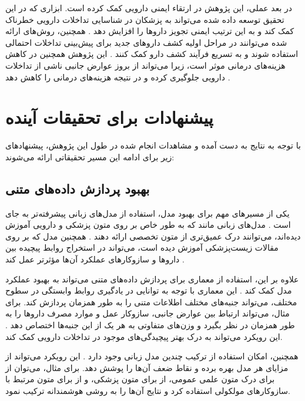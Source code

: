 در بعد عملی، این پژوهش در ارتقاء ایمنی دارویی کمک کرده است. ابزاری که در این تحقیق توسعه داده شده می‌تواند به پزشکان در شناسایی تداخلات دارویی خطرناک کمک کند و به این ترتیب ایمنی تجویز داروها را افزایش دهد \cite{ref_cascorbi2012}. همچنین، روش‌های ارائه شده می‌توانند در مراحل اولیه کشف داروهای جدید برای پیش‌بینی تداخلات احتمالی استفاده شوند و به تسریع فرآیند کشف دارو کمک کنند \cite{ref_ryu2018}. این پژوهش همچنین در کاهش هزینه‌های درمانی موثر است، زیرا می‌تواند از بروز عوارض جانبی ناشی از تداخلات دارویی جلوگیری کرده و در نتیجه هزینه‌های درمانی را کاهش دهد \cite{ref_huang2013}.

\section{پیشنهادات برای تحقیقات آینده}

با توجه به نتایج به دست آمده و مشاهدات انجام شده در طول این پژوهش، پیشنهادهای زیر برای ادامه این مسیر تحقیقاتی ارائه می‌شوند:

\subsection{بهبود پردازش داده‌های متنی}
یکی از مسیرهای مهم برای بهبود مدل، استفاده از مدل‌های زبانی پیشرفته‌تر به جای  است \cite{ref_beltagy2019}. مدل‌های زبانی مانند  که به طور خاص بر روی متون پزشکی و دارویی آموزش دیده‌اند، می‌توانند درک عمیق‌تری از متون تخصصی ارائه دهند \cite{ref_devlin2018}. همچنین مدل  که بر روی مقالات زیست‌پزشکی آموزش دیده است، می‌تواند در استخراج روابط پیچیده بین داروها و سازوکار‌های عملکرد آن‌ها مؤثرتر عمل کند \cite{ref_he2023}.

علاوه بر این، استفاده از معماری  برای پردازش داده‌های متنی می‌تواند به بهبود عملکرد مدل کمک کند \cite{ref_dai2020}. این معماری با توجه به توانایی در یادگیری روابط وابستگی در سطوح مختلف، می‌تواند جنبه‌های مختلف اطلاعات متنی را به طور همزمان پردازش کند. برای مثال، می‌تواند ارتباط بین عوارض جانبی، سازوکار عمل و موارد مصرف داروها را به طور همزمان در نظر بگیرد و وزن‌های متفاوتی به هر یک از این جنبه‌ها اختصاص دهد \cite{ref_shi2024}. این رویکرد می‌تواند به درک بهتر پیچیدگی‌های موجود در تداخلات دارویی کمک کند.

همچنین، امکان استفاده از ترکیب چندین مدل زبانی وجود دارد \cite{ref_wang2024}. این رویکرد می‌تواند از مزایای هر مدل بهره برده و نقاط ضعف آن‌ها را پوشش دهد. برای مثال، می‌توان از  برای درک متون علمی عمومی، از  برای متون پزشکی، و از  برای متون مرتبط با سازوکار‌های مولکولی استفاده کرد و نتایج آن‌ها را به روشی هوشمندانه ترکیب نمود.

